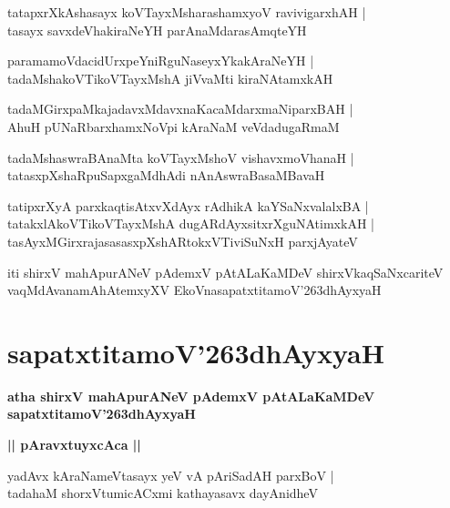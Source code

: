 \documentclass[twoside,12pt,openright]{book}
\def\S{\char'263}
\newcounter{shloka}[chapter]
\def\uvaca#1{\centerline{{\large\textbf{#1}}}}
\begin{document}
\begin{shloka}%
tatapxrXkAshasayx koVTayxMsharashamxyoV ravivigarxhAH |\\
tasayx savxdeVhakiraNeYH parAnaMdarasAmqteYH 
\end{shloka}

\begin{shloka}%
paramamoVdacidUrxpeYniRguNaseyxYkakAraNeYH |\\
tadaMshakoVTikoVTayxMshA jiVvaMti kiraNAtamxkAH 
\end{shloka}

\begin{shloka}%
tadaMGirxpaMkajadavxMdavxnaKacaMdarxmaNiparxBAH |\\
AhuH pUNaRbarxhamxNoVpi kAraNaM veVdadugaRmaM 
\end{shloka}

\begin{shloka}%
tadaMshaswraBAnaMta koVTayxMshoV vishavxmoVhanaH |\\
tatasxpXshaRpuSapxgaMdhAdi nAnAswraBasaMBavaH 
\end{shloka}

\begin{shloka}%
tatipxrXyA parxkaqtisAtxvXdAyx rAdhikA kaYSaNxvalalxBA |\\
tatakxlAkoVTikoVTayxMshA dugARdAyxsitxrXguNAtimxkAH |\\
tasAyxMGirxrajasasasxpXshARtokxVTiviSuNxH parxjAyateV 
\end{shloka}

\begin{center}
iti shirxV mahApurANeV pAdemxV pAtALaKaMDeV shirxVkaqSaNxcariteV  
vaqMdAvanamAhAtemxyXV EkoVnasapatxtitamoV\S dhAyxyaH
\end{center}

\chapter{sapatxtitamoV\S dhAyxyaH}

\begin{center}
{\LARGE\bfseries atha shirxV mahApurANeV pAdemxV pAtALaKaMDeV sapatxtitamoV\S dhAyxyaH}
\end{center}

\uvaca{|| pAravxtuyxcAca ||}

\begin{shloka}%
yadAvx kAraNameVtasayx yeV vA pAriSadAH parxBoV |\\
tadahaM shorxVtumicACxmi kathayasavx dayAnidheV 
\end{shloka}
\end{document}
